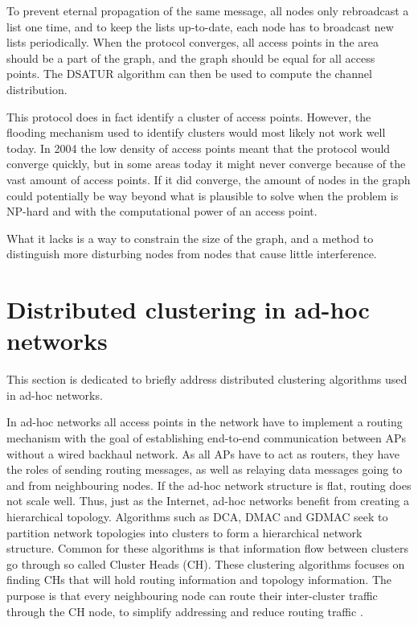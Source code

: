 To prevent eternal propagation of the same message, all nodes only rebroadcast a list one time, and to keep the lists up-to-date, each node has to broadcast new
lists periodically. When the protocol converges, all access points in the area should be a part of the graph, and the graph should be equal for all access points. The DSATUR algorithm can then be used to compute the channel distribution.

This protocol does in fact identify a cluster of access points. However, the flooding mechanism used to identify clusters
would most likely not work well today. In 2004 the low density of access points meant that the protocol would converge quickly, but in some areas today it might never converge because
of the vast amount of access points. If it did converge, the amount of nodes in the graph could potentially be way beyond what is plausible to solve when the problem is NP-hard and with the computational power of an access point. 

What it lacks is a way to constrain the size of the graph, and a method to distinguish more disturbing nodes from nodes that cause little interference.

%
\section{Distributed clustering in ad-hoc networks}
This section is dedicated to briefly address distributed clustering algorithms used in ad-hoc networks.

In ad-hoc networks all access points in the network have to implement a routing mechanism with the goal of establishing end-to-end communication 
between APs without a wired backhaul network. As all APs have to act as routers, they have the roles of sending routing messages, as well as relaying data messages
going to and from neighbouring nodes. If the ad-hoc network structure is flat, routing does not scale well. Thus, just as the Internet, ad-hoc networks benefit
from creating a hierarchical topology. Algorithms such as DCA, DMAC  and GDMAC \cite{Basagni} seek to partition network topologies into clusters to form a hierarchical network structure.
Common for these algorithms is that information flow between clusters go through so called Cluster Heads (CH). These clustering algorithms focuses on finding CHs that will hold routing information and topology information. The purpose is that every neighbouring node can route their inter-cluster traffic through the CH node, to simplify addressing and reduce routing traffic \cite{Mamalis}.


